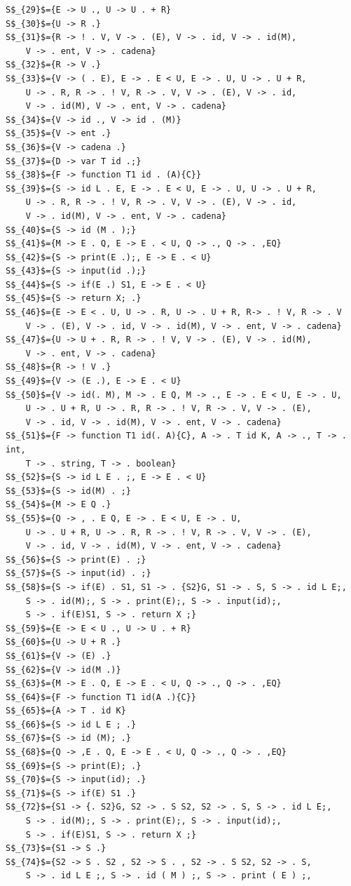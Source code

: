 \documentclass[a4paper, 12pt]{article}
\begin{document}
\begin{lstlisting}[style =EstadosAutomataST]
S$_{29}$={E -> U ., U -> U . + R}
S$_{30}$={U -> R .}
S$_{31}$={R -> ! . V, V -> . (E), V -> . id, V -> . id(M), 
	V -> . ent, V -> . cadena}
S$_{32}$={R -> V .}
S$_{33}$={V -> ( . E), E -> . E < U, E -> . U, U -> . U + R,
	U -> . R, R -> . ! V, R -> . V, V -> . (E), V -> . id,
	V -> . id(M), V -> . ent, V -> . cadena}
S$_{34}$={V -> id ., V -> id . (M)}
S$_{35}$={V -> ent .}
S$_{36}$={V -> cadena .}
S$_{37}$={D -> var T id .;}
S$_{38}$={F -> function T1 id . (A){C}}
S$_{39}$={S -> id L . E, E -> . E < U, E -> . U, U -> . U + R,
	U -> . R, R -> . ! V, R -> . V, V -> . (E), V -> . id,
	V -> . id(M), V -> . ent, V -> . cadena}
S$_{40}$={S -> id (M . );}
S$_{41}$={M -> E . Q, E -> E . < U, Q -> ., Q -> . ,EQ}
S$_{42}$={S -> print(E .);, E -> E . < U}
S$_{43}$={S -> input(id .);}
S$_{44}$={S -> if(E .) S1, E -> E . < U}
S$_{45}$={S -> return X; .}
S$_{46}$={E -> E < . U, U -> . R, U -> . U + R, R-> . ! V, R -> . V
	V -> . (E), V -> . id, V -> . id(M), V -> . ent, V -> . cadena}
S$_{47}$={U -> U + . R, R -> . ! V, V -> . (E), V -> . id(M), 
	V -> . ent, V -> . cadena}
S$_{48}$={R -> ! V .}
S$_{49}$={V -> (E .), E -> E . < U}
S$_{50}$={V -> id(. M), M -> . E Q, M -> ., E -> . E < U, E -> . U, 
	U -> . U + R, U -> . R, R -> . ! V, R -> . V, V -> . (E),
	V -> . id, V -> . id(M), V -> . ent, V -> . cadena}
S$_{51}$={F -> function T1 id(. A){C}, A -> . T id K, A -> ., T -> . int,
	T -> . string, T -> . boolean}
S$_{52}$={S -> id L E . ;, E -> E . < U}
S$_{53}$={S -> id(M) . ;}
S$_{54}$={M -> E Q .}
S$_{55}$={Q -> , . E Q, E -> . E < U, E -> . U, 
	U -> . U + R, U -> . R, R -> . ! V, R -> . V, V -> . (E),
	V -> . id, V -> . id(M), V -> . ent, V -> . cadena}
S$_{56}$={S -> print(E) . ;}
S$_{57}$={S -> input(id) . ;}
S$_{58}$={S -> if(E) . S1, S1 -> . {S2}G, S1 -> . S, S -> . id L E;,
	S -> . id(M);, S -> . print(E);, S -> . input(id);,
	S -> . if(E)S1, S -> . return X ;}
S$_{59}$={E -> E < U ., U -> U . + R}
S$_{60}$={U -> U + R .}
S$_{61}$={V -> (E) .}
S$_{62}$={V -> id(M .)}
S$_{63}$={M -> E . Q, E -> E . < U, Q -> ., Q -> . ,EQ}
S$_{64}$={F -> function T1 id(A .){C}}
S$_{65}$={A -> T . id K}
S$_{66}$={S -> id L E ; .}
S$_{67}$={S -> id (M); .}
S$_{68}$={Q -> ,E . Q, E -> E . < U, Q -> ., Q -> . ,EQ}
S$_{69}$={S -> print(E); .}
S$_{70}$={S -> input(id); .}
S$_{71}$={S -> if(E) S1 .}
S$_{72}$={S1 -> {. S2}G, S2 -> . S S2, S2 -> . S, S -> . id L E;,
	S -> . id(M);, S -> . print(E);, S -> . input(id);,
	S -> . if(E)S1, S -> . return X ;}
S$_{73}$={S1 -> S .}
S$_{74}$={S2 -> S . S2 , S2 -> S . , S2 -> . S S2, S2 -> . S, 
	S -> . id L E ;, S -> . id ( M ) ;, S -> . print ( E ) ;,

\end{lstlisting}
\end{document}
